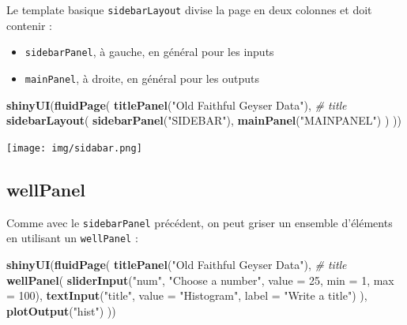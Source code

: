 \documentclass[
]{article}
\newenvironment{Shaded}{\begin{snugshade}}{\end{snugshade}}
\newcommand{\AttributeTok}[1]{\textcolor[rgb]{0.13,0.29,0.53}{#1}}
\newcommand{\CommentTok}[1]{\textcolor[rgb]{0.56,0.35,0.01}{\textit{#1}}}
\newcommand{\DecValTok}[1]{\textcolor[rgb]{0.00,0.00,0.81}{#1}}
\newcommand{\FunctionTok}[1]{\textcolor[rgb]{0.13,0.29,0.53}{\textbf{#1}}}
\newcommand{\NormalTok}[1]{#1}
\newcommand{\StringTok}[1]{\textcolor[rgb]{0.31,0.60,0.02}{#1}}
\begin{document}
Le template basique \texttt{sidebarLayout} divise la page en deux
colonnes et doit contenir :

\begin{itemize}
\item
  \texttt{sidebarPanel}, à gauche, en général pour les inputs
\item
  \texttt{mainPanel}, à droite, en général pour les outputs
\end{itemize}

\begin{Shaded}
\begin{Highlighting}[]
\FunctionTok{shinyUI}\NormalTok{(}\FunctionTok{fluidPage}\NormalTok{(}
  \FunctionTok{titlePanel}\NormalTok{(}\StringTok{"Old Faithful Geyser Data"}\NormalTok{), }\CommentTok{\# title}
  \FunctionTok{sidebarLayout}\NormalTok{(}
    \FunctionTok{sidebarPanel}\NormalTok{(}\StringTok{"SIDEBAR"}\NormalTok{),}
    \FunctionTok{mainPanel}\NormalTok{(}\StringTok{"MAINPANEL"}\NormalTok{)}
\NormalTok{  )}
\NormalTok{))}
\end{Highlighting}
\end{Shaded}

\texttt{[image: img/sidabar.png]}

\hypertarget{wellpanel}{%
\subsection{wellPanel}\label{wellpanel}}

Comme avec le \texttt{sidebarPanel} précédent, on peut griser un
ensemble d'éléments en utilisant un \texttt{wellPanel} :

\begin{Shaded}
\begin{Highlighting}[]
\FunctionTok{shinyUI}\NormalTok{(}\FunctionTok{fluidPage}\NormalTok{(}
  \FunctionTok{titlePanel}\NormalTok{(}\StringTok{"Old Faithful Geyser Data"}\NormalTok{), }\CommentTok{\# title}
  \FunctionTok{wellPanel}\NormalTok{(}
    \FunctionTok{sliderInput}\NormalTok{(}\StringTok{"num"}\NormalTok{, }\StringTok{"Choose a number"}\NormalTok{, }\AttributeTok{value =} \DecValTok{25}\NormalTok{, }\AttributeTok{min =} \DecValTok{1}\NormalTok{, }\AttributeTok{max =} \DecValTok{100}\NormalTok{),  }
    \FunctionTok{textInput}\NormalTok{(}\StringTok{"title"}\NormalTok{, }\AttributeTok{value =} \StringTok{"Histogram"}\NormalTok{, }\AttributeTok{label =} \StringTok{"Write a title"}\NormalTok{)}
\NormalTok{  ),}
  \FunctionTok{plotOutput}\NormalTok{(}\StringTok{"hist"}\NormalTok{)}
\NormalTok{))}
\end{Highlighting}
\end{Shaded}
\end{document}
